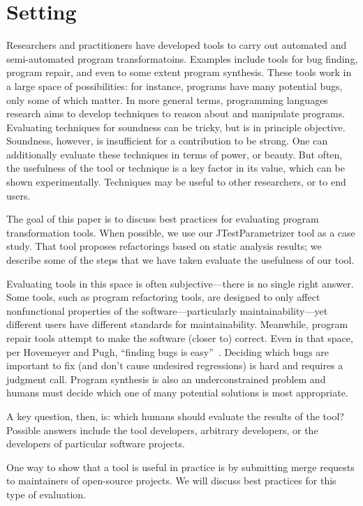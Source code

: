 \section{Setting}
Researchers and practitioners have developed tools to carry out
automated and semi-automated program transformatoins.  Examples
include tools for bug finding, program repair, and even to some extent
program synthesis. These tools work in a large space of possibilities:
for instance, programs have many potential bugs, only some of which
matter.
In more general terms, programming languages research aims to develop
techniques to reason about and manipulate programs. Evaluating
techniques for soundness can be tricky, but is in principle
objective. Soundness, however, is insufficient for a contribution to
be strong. One can additionally evaluate these techniques in terms of
power, or beauty. But often, the usefulness of the tool or technique
is a key factor in its value, which can be shown
experimentally. Techniques may be useful to other researchers, or to
end users.

The goal of this paper is to discuss best practices for evaluating
program transformation tools. When possible, we use our
JTestParametrizer tool as a case study. That tool proposes
refactorings based on static analysis results; we describe some of the
steps that we have taken evaluate the usefulness of our tool.

Evaluating tools in this space is often subjective---there is no
single right answer. Some tools, such as program refactoring tools,
are designed to only affect nonfunctional properties of the
software---particularly maintainability---yet different users have
different standards for maintainability.  Meanwhile, program repair
tools attempt to make the software (closer to) correct. Even in that
space, per Hovemeyer and Pugh, ``finding bugs is
easy''~\cite{hovemeyer04:_findin_bugs_easy}. Deciding which bugs are
important to fix (and don't cause undesired regressions) is hard and
requires a judgment call. Program synthesis is also an
underconstrained problem and humans must decide which one of many
potential solutions is most appropriate.

A key question, then, is: which humans should evaluate the results of the tool?
Possible answers include the tool developers, arbitrary developers, or the developers
of particular software projects.

One way to show that a tool is useful in practice is by submitting merge requests to maintainers of open-source projects. We will discuss best practices for this type of evaluation.



